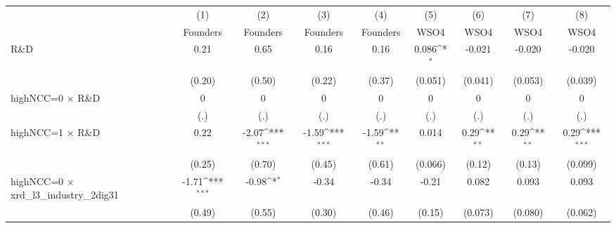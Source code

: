 {
\def\sym#1{\ifmmode^{#1}\else\(^{#1}\)\fi}
\begin{tabular}{l*{8}{c}}
\toprule
                    &\multicolumn{1}{c}{(1)}&\multicolumn{1}{c}{(2)}&\multicolumn{1}{c}{(3)}&\multicolumn{1}{c}{(4)}&\multicolumn{1}{c}{(5)}&\multicolumn{1}{c}{(6)}&\multicolumn{1}{c}{(7)}&\multicolumn{1}{c}{(8)}\\
                    &\multicolumn{1}{c}{Founders}&\multicolumn{1}{c}{Founders}&\multicolumn{1}{c}{Founders}&\multicolumn{1}{c}{Founders}&\multicolumn{1}{c}{WSO4}&\multicolumn{1}{c}{WSO4}&\multicolumn{1}{c}{WSO4}&\multicolumn{1}{c}{WSO4}\\
\midrule
R\&D                &        0.21         &        0.65         &        0.16         &        0.16         &       0.086\sym{*}  &      -0.021         &      -0.020         &      -0.020         \\
                    &      (0.20)         &      (0.50)         &      (0.22)         &      (0.37)         &     (0.051)         &     (0.041)         &     (0.053)         &     (0.039)         \\
\addlinespace
highNCC=0 $\times$ R\&D&           0         &           0         &           0         &           0         &           0         &           0         &           0         &           0         \\
                    &         (.)         &         (.)         &         (.)         &         (.)         &         (.)         &         (.)         &         (.)         &         (.)         \\
\addlinespace
highNCC=1 $\times$ R\&D&        0.22         &       -2.07\sym{***}&       -1.59\sym{***}&       -1.59\sym{**} &       0.014         &        0.29\sym{**} &        0.29\sym{**} &        0.29\sym{***}\\
                    &      (0.25)         &      (0.70)         &      (0.45)         &      (0.61)         &     (0.066)         &      (0.12)         &      (0.13)         &     (0.099)         \\
\addlinespace
highNCC=0 $\times$ xrd\_l3\_industry\_2dig31&       -1.71\sym{***}&       -0.98\sym{*}  &       -0.34         &       -0.34         &       -0.21         &       0.082         &       0.093         &       0.093         \\
                    &      (0.49)         &      (0.55)         &      (0.30)         &      (0.46)         &      (0.15)         &     (0.073)         &     (0.080)         &     (0.062)         \\

\end{tabular}}
